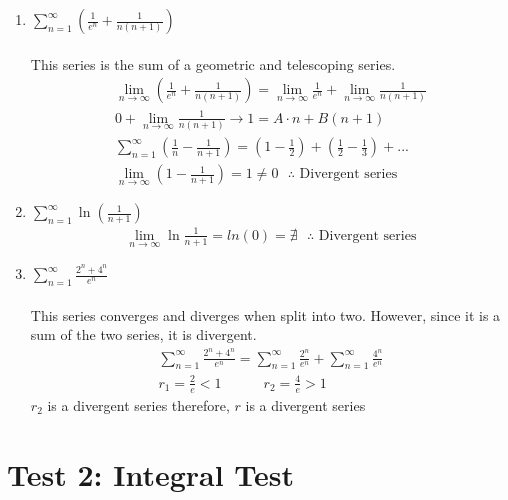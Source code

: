 \documentclass[12pt]{article}
\begin{document}
\begin{enumerate}
    \begin{enumerate}
        \item $\sum_{n=1}^\infty\left(\frac{1}{e^n}+\frac{1}{n(n+1)}\right)$
        \\\\This series is the sum of a geometric and telescoping series.
        \begin{align*}
            \lim_{n\to\infty}\left(\frac{1}{e^n}+\frac{1}{n(n+1)}\right)=\lim_{n\to\infty}\frac{1}{e^n} + \lim_{n\to\infty}\frac{1}{n(n+1)}\\
        0+\lim_{n\to\infty}\frac{1}{n(n+1)} \to 1=A\cdot n + B(n+1)\\
        \sum_{n=1}^\infty\left(\frac{1}{n}-\frac{1}{n+1}\right)=\left(1-\frac{1}{2}\right)+\left(\frac{1}{2}-\frac{1}{3}\right)+...\\
        \lim_{n\to\infty}\left(1-\frac{1}{n+1}\right)=1 \neq 0\text{ $\therefore$ Divergent series}
        \end{align*}
        \item $\sum_{n=1}^\infty\ln{\left(\frac{1}{n+1}\right)}$
            \begin{align*}
                \lim_{n\to\infty}\ln{\frac{1}{n+1}}=ln(0)=\nexists \text{ $\therefore$ Divergent series}
            \end{align*}
        \item
        $\sum_{n=1}^\infty\frac{2^n+4^n}{e^n}$ \\\\This series converges and diverges when split into two. However, since it is a sum of the two series, it is divergent. 
        \begin{align*}
            \sum_{n=1}^\infty\frac{2^n+4^n}{e^n} = \sum_{n=1}^\infty\frac{2^n}{e^n} + \sum_{n=1}^\infty\frac{4^n}{e^n}\\
            r_1 = \frac{2}{e} < 1 \quad\quad\quad r_2 = \frac{4}{e} > 1
            \end{align*}
            $r_2$ is a divergent series therefore, $r$ is a divergent series
    \end{enumerate}
\end{enumerate}
\newpage\section{Test 2: Integral Test}
\end{document}
